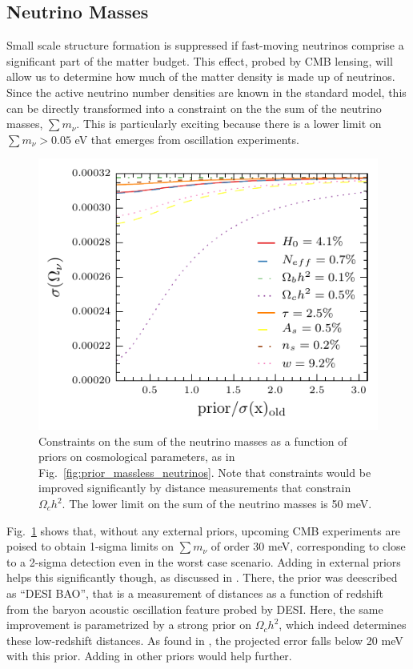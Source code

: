 \documentclass[aps,prd,reprint,superscriptaddress]{revtex4-1}
\newcommand{\reffig}[1]{Fig.~\ref{fig:#1}}
\begin{document}
\subsection{Neutrino Masses}

Small scale structure formation is suppressed if fast-moving neutrinos comprise a significant part of the matter budget. This effect, probed by CMB lensing, will allow us to determine how much of the matter density is made up of neutrinos. Since the active neutrino number densities are known in the standard model, this can be directly transformed into a constraint on the the sum of the neutrino masses, $\sum m_\nu$. This is particularly exciting because there is a lower limit on $\sum m_\nu>0.05$ eV that emerges from oscillation experiments. 



\begin{figure}[htbp]
\begin{center}
\includegraphics{prior_omnuh2_snow_mass.pdf}
\caption{Constraints on the sum of the neutrino masses as a function of priors on cosmological parameters, as in \reffig{prior_massless_neutrinos}.  Note that constraints would be improved significantly  by distance measurements that constrain $\Omega_ch^2$. The lower limit on the sum of the neutrino masses is 50 meV.}
\label{fig:prior_omeganuh2}
\end{center}
\end{figure}


\reffig{prior_omeganuh2} shows that, without any external priors, upcoming CMB experiments are poised to obtain 1-sigma limits on $\sum m_\nu$ of order 30 meV, corresponding to close to a 2-sigma detection even in the worst case scenario. Adding in external priors helps this significantly though, as discussed in \citet{2013arXiv1309.5383A}. There, the prior was deescribed as ``DESI BAO'', that is a measurement of distances as a function of redshift from the baryon acoustic oscillation feature probed by DESI. Here, the same improvement is parametrized by a strong prior on $\Omega_ch^2$, which indeed determines these low-redshift distances. As found in \cite{2013arXiv1309.5383A}, the projected error falls below 20 meV with this prior. Adding in other priors would help further.
\end{document}
